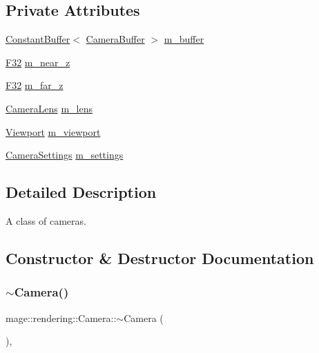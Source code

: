 \subsection*{Private Attributes}
\begin{DoxyCompactItemize}
\item 
\hyperlink{classmage_1_1rendering_1_1_constant_buffer}{Constant\+Buffer}$<$ \hyperlink{structmage_1_1rendering_1_1_camera_buffer}{Camera\+Buffer} $>$ \hyperlink{classmage_1_1rendering_1_1_camera_a81012e035e7117cac50434c2d85ac0ad}{m\+\_\+buffer}
\item 
\hyperlink{namespacemage_aa97e833b45f06d60a0a9c4fc22ae02c0}{F32} \hyperlink{classmage_1_1rendering_1_1_camera_ada7de69941daee12a7f798d8f056ffc6}{m\+\_\+near\+\_\+z}
\item 
\hyperlink{namespacemage_aa97e833b45f06d60a0a9c4fc22ae02c0}{F32} \hyperlink{classmage_1_1rendering_1_1_camera_a53ed00e226581b4bb0aecdc7326d852c}{m\+\_\+far\+\_\+z}
\item 
\hyperlink{classmage_1_1rendering_1_1_camera_lens}{Camera\+Lens} \hyperlink{classmage_1_1rendering_1_1_camera_a0716fc9d2b3c8f41da75205caa428189}{m\+\_\+lens}
\item 
\hyperlink{classmage_1_1rendering_1_1_viewport}{Viewport} \hyperlink{classmage_1_1rendering_1_1_camera_af01065cfadb5c8442bcc0f823254b09e}{m\+\_\+viewport}
\item 
\hyperlink{classmage_1_1rendering_1_1_camera_settings}{Camera\+Settings} \hyperlink{classmage_1_1rendering_1_1_camera_a9a8cfd88c1a3b2b54779bbe0f34d30d2}{m\+\_\+settings}
\end{DoxyCompactItemize}


\subsection{Detailed Description}
A class of cameras. 

\subsection{Constructor \& Destructor Documentation}
\hypertarget{classmage_1_1rendering_1_1_camera_ae892311357bddc9ea081912579f8cd9c}{}\label{classmage_1_1rendering_1_1_camera_ae892311357bddc9ea081912579f8cd9c} 
\subsubsection{\texorpdfstring{$\sim$\+Camera()}{~Camera()}}
{\footnotesize\ttfamily mage\+::rendering\+::\+Camera\+::$\sim$\+Camera (\begin{DoxyParamCaption}{ }\end{DoxyParamCaption})\hspace{0.3cm}{\ttfamily [virtual]}, {\ttfamily [default]}}

